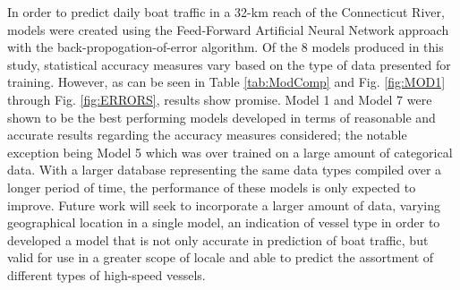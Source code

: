 \documentclass[
10pt, %
letterpaper, %
twoside, %
headinclude,footinclude, %
BCOR5mm, %
]{scrartcl}
\begin{document}
In order to predict daily boat traffic in a 32-km reach of the Connecticut River, models were created using the Feed-Forward Artificial Neural Network approach with the back-propogation-of-error algorithm. Of the 8 models produced in this study, statistical accuracy measures vary based on the type of data presented for training. However, as can be seen in Table \ref{tab:ModComp} and Fig. \ref{fig:MOD1} through Fig. \ref{fig:ERRORS}, results show promise. Model 1 and Model 7 were shown to be the best performing models developed in terms of reasonable and accurate results regarding the accuracy measures considered; the notable exception being Model 5 which was over trained on a large amount of categorical data. With a larger database representing the same data types compiled over a longer period of time, the performance of these models is only expected to improve. Future work will seek to incorporate a larger amount of data, varying geographical location in a single model, an indication of vessel type in order to developed a model that is not only accurate in prediction of boat traffic, but valid for use in a greater scope of locale and able to predict the assortment of different types of high-speed vessels.




\end{document}
